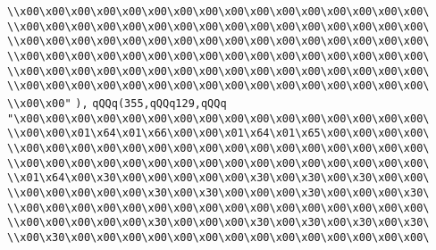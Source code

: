 \verb|\\x00\x00\x00\x00\x00\x00\x00\x00\x00\x00\x00\x00\x00\x00\x00\x00\|\newline
\verb|\\x00\x00\x00\x00\x00\x00\x00\x00\x00\x00\x00\x00\x00\x00\x00\x00\|\newline
\verb|\\x00\x00\x00\x00\x00\x00\x00\x00\x00\x00\x00\x00\x00\x00\x00\x00\|\newline
\verb|\\x00\x00\x00\x00\x00\x00\x00\x00\x00\x00\x00\x00\x00\x00\x00\x00\|\newline
\verb|\\x00\x00\x00\x00\x00\x00\x00\x00\x00\x00\x00\x00\x00\x00\x00\x00\|\newline
\verb|\\x00\x00\x00\x00\x00\x00\x00\x00\x00\x00\x00\x00\x00\x00\x00\x00\|\newline
\verb|\\x00\x00"|\newline
\verb|),|\newline
\verb|qQQq(355,qQQq129,qQQq|\newline
\verb|"\x00\x00\x00\x00\x00\x00\x00\x00\x00\x00\x00\x00\x00\x00\x00\x00\|\newline
\verb|\\x00\x00\x01\x64\x01\x66\x00\x00\x01\x64\x01\x65\x00\x00\x00\x00\|\newline
\verb|\\x00\x00\x00\x00\x00\x00\x00\x00\x00\x00\x00\x00\x00\x00\x00\x00\|\newline
\verb|\\x00\x00\x00\x00\x00\x00\x00\x00\x00\x00\x00\x00\x00\x00\x00\x00\|\newline
\verb|\\x01\x64\x00\x30\x00\x00\x00\x00\x00\x30\x00\x30\x00\x30\x00\x00\|\newline
\verb|\\x00\x00\x00\x00\x00\x30\x00\x30\x00\x00\x00\x30\x00\x00\x00\x30\|\newline
\verb|\\x00\x00\x00\x00\x00\x00\x00\x00\x00\x00\x00\x00\x00\x00\x00\x00\|\newline
\verb|\\x00\x00\x00\x00\x00\x30\x00\x00\x00\x30\x00\x30\x00\x30\x00\x30\|\newline
\verb|\\x00\x30\x00\x00\x00\x00\x00\x00\x00\x00\x00\x00\x00\x00\x00\x00\|\newline
